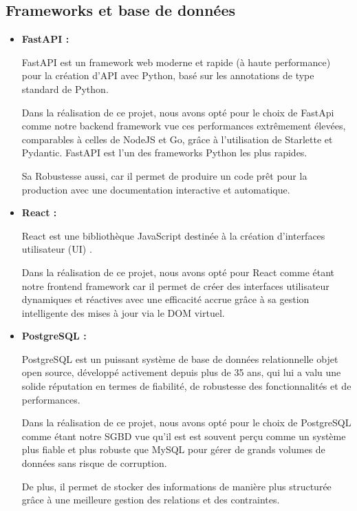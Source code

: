 \subsection{Frameworks et base de données}
    \begin{itemize}
        \item\textbf{FastAPI : }
            \par FastAPI est un framework web moderne et rapide (à haute performance) pour la création d'API avec Python,
            basé sur les annotations de type standard de Python\cite{fastapi}. 
            \par Dans la réalisation de ce projet, nous avons opté pour le choix de FastApi comme notre backend framework vue ces performances extrêmement élevées, comparables à celles de NodeJS et Go, grâce à l'utilisation de Starlette et Pydantic.
            FastAPI est l'un des frameworks Python les plus rapides.
            \par Sa Robustesse aussi, car il permet de produire un code prêt pour la production avec une documentation interactive et automatique.
        \item\textbf{React : }
                    \par React est une bibliothèque JavaScript destinée à la création d'interfaces utilisateur (UI) \cite{react}. 
                    \par Dans la réalisation de ce projet, nous avons opté pour React comme étant notre frontend framework car il  permet de créer des interfaces utilisateur dynamiques et réactives avec une efficacité accrue grâce à sa gestion intelligente des mises à jour via le DOM virtuel.
                    \item\textbf{PostgreSQL : }
                    \par PostgreSQL est un puissant système de base de données relationnelle objet open source, développé activement depuis plus de 35 ans, qui lui a valu une solide réputation en termes de fiabilité, de robustesse des fonctionnalités et de performances\cite{pg}. 
                    \par Dans la réalisation de ce projet, nous avons opté pour le choix de PostgreSQL comme étant notre SGBD vue qu'il est est souvent perçu comme un système plus fiable et plus robuste que MySQL pour gérer de grands volumes de données sans risque de corruption.
                    \par De plus, il permet de stocker des informations de manière plus structurée grâce à une meilleure gestion des relations et des contraintes.
                \end{itemize}

